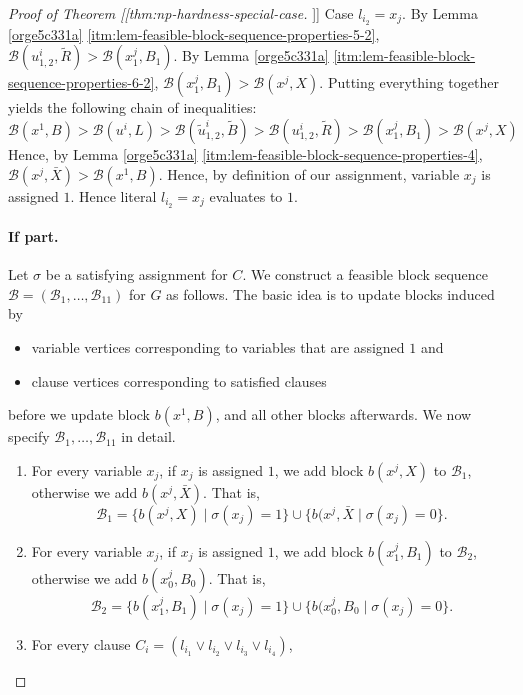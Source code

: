 \documentclass[fontsize=11pt,paper=a4]{book}
\begin{document}
\begin{proof}[Proof of Theorem [[thm:np-hardness-special-case]]]
Case \(l_{i_2}=x_j\).
By Lemma \ref{orge5c331a} \ref{itm:lem-feasible-block-sequence-properties-5-2}, \(\mathcal{B}(u_{1,2}^i,\tilde{R})>\mathcal{B}(x_1^j,B_1)\).
By Lemma \ref{orge5c331a} \ref{itm:lem-feasible-block-sequence-properties-6-2}, \(\mathcal{B}(x_1^j,B_1)>\mathcal{B}(x^j,X)\).
Putting everything together yields the following chain of inequalities:
\[
\mathcal{B}(x^1,B)>
\mathcal{B}(u^i,L)>
\mathcal{B}(\tilde{u}_{1,2}^i,\tilde{B})>
\mathcal{B}(u_{1,2}^i,\tilde{R})>
\mathcal{B}(x_1^j,B_1)>
\mathcal{B}(x^j,X)
\]
Hence, by Lemma \ref{orge5c331a} \ref{itm:lem-feasible-block-sequence-properties-4}, \(\mathcal{B}(x^j,\bar{X})>\mathcal{B}(x^1,B)\).
Hence, by definition of our assignment, variable \(x_j\) is assigned \(1\).
Hence literal \(l_{i_2}=x_j\) evaluates to \(1\).

\paragraph{If part.}
Let \(\sigma\) be a satisfying assignment for \(C\).
We construct a feasible block sequence \(\mathcal{B}=(\mathscr{B}_1,\dots,\mathscr{B}_{11})\) for \(G\) as follows.
The basic idea is to update blocks induced by

\begin{itemize}
\item variable vertices corresponding to variables that are assigned \(1\) and

\item clause vertices corresponding to satisfied clauses
\end{itemize}


before we update block \(b(x^1,B)\), and all other blocks afterwards.
We now specify \(\mathscr{B}_1,\dots,\mathscr{B}_{11}\) in detail.

\begin{enumerate}
\item For every variable \(x_j\), if \(x_j\) is assigned \(1\), we add block \(b(x^j,X)\) to \(\mathscr{B}_1\), otherwise we add \(b(x^j,\bar{X})\).
That is,
\[
   \mathscr{B}_1=\{b(x^j,X)\mid\sigma(x_j)=1\}\cup\{b(x^j,\bar{X}\mid\sigma(x_j)=0\}.
   \]

\item For every variable \(x_j\), if \(x_j\) is assigned \(1\), we add block \(b(x_1^j,B_1)\) to \(\mathscr{B}_2\), otherwise we add \(b(x_0^j,B_0)\).
That is,
\[
   \mathscr{B}_2=\{b(x_1^j,B_1)\mid\sigma(x_j)=1\}\cup\{b(x_0^j,B_0\mid\sigma(x_j)=0\}.
   \]

\item For every clause \(C_i=(l_{i_1}\vee l_{i_2}\vee l_{i_3}\vee l_{i_4})\),


\end{enumerate}
\end{proof}
\end{document}
